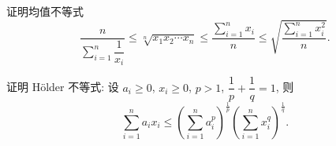 \documentclass[../数学分析培优讲义.tex]{subfiles}
\begin{document}
\begin{example}[\markstar]
证明均值不等式
\[
    \dfrac{n}{\displaystyle\sum\limits_{i=1}^n\dfrac{1}{x_i}}
    \leq\sqrt[n]{x_1x_2\cdots x_n}
    \leq\dfrac{\displaystyle\sum\limits_{i=1}^n x_i}{n}
    \leq\sqrt{\dfrac{\displaystyle\sum\limits_{i=1}^n x_i^2}{n}}.
\]
\end{example}
\exampleblank

\begin{example}[\markstar]
证明 H\"older 不等式: 设 $a_i\geq0$, $x_i\geq0$, $p>1$, $\dfrac{1}{p}+\dfrac{1}{q}=1$, 则
\[
    \sum\limits_{i=1}^na_ix_i
    \leq\left(\sum\limits_{i=1}^na_i^p\right)^{\frac{1}{p}}
    \left(\sum\limits_{i=1}^nx_i^q\right)^{\frac{1}{q}}.
\]
\end{example}
\exampleblank
\end{document}
